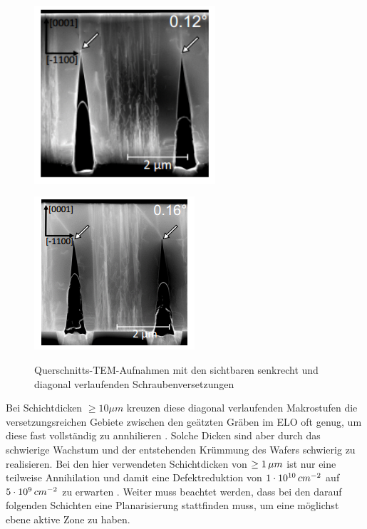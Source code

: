 \begin{figure}[ht!]
  \centering
  \begin{minipage}[t]{0.49\textwidth}
    \centering
    \includegraphics[width=0.6\textwidth]{Bilder/offcutsenkrecht.png}
    \label{fig:offcutsenkrecht}
  \end{minipage}
	\hfill
  \begin{minipage}[t]{0.49\textwidth}
    \centering
    \includegraphics[width=0.6\linewidth]{Bilder/offcutdiagonal.png}
    \label{fig:offcutdiagonal}
  \end{minipage}
	\caption{Querschnitts-TEM-Aufnahmen mit den sichtbaren senkrecht und diagonal verlaufenden Schraubenversetzungen}
	\label{fig:schraubenvers1}
\end{figure}
Bei Schichtdicken $ \geq 10 \mu m $ kreuzen diese diagonal verlaufenden Makrostufen die versetzungsreichen Gebiete zwischen den geätzten Gräben im ELO oft genug, um diese fast vollständig zu annhilieren \cite{fmehnke}. Solche Dicken sind aber durch das schwierige Wachstum und der entstehenden Krümmung des Wafers schwierig zu realisieren. Bei den hier verwendeten Schichtdicken von $ \geq 1\thinspace \mu m $ ist nur eine teilweise Annihilation und damit eine Defektreduktion von $1\cdot 10^{10} \thinspace cm^{-2}$ auf $5\cdot 10^9 \thinspace cm^{-2}$ zu erwarten \cite{fmehnke}. 
\newline
Weiter muss beachtet werden, dass bei den darauf folgenden Schichten eine Planarisierung stattfinden muss, um eine möglichst ebene aktive Zone zu haben. 

